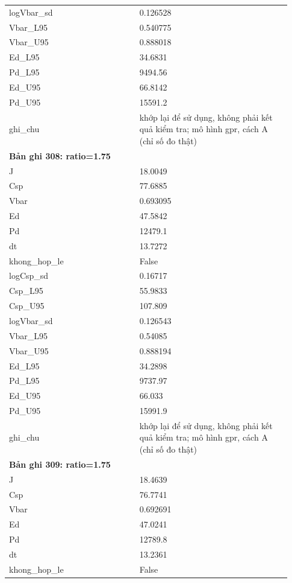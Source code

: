 \begin{longtable}{p{0.43\linewidth}p{0.50\linewidth}}
logVbar\_\allowbreak sd & 0.126528 \\
Vbar\_\allowbreak L95 & 0.540775 \\
Vbar\_\allowbreak U95 & 0.888018 \\
Ed\_\allowbreak L95 & 34.6831 \\
Pd\_\allowbreak L95 & 9494.56 \\
Ed\_\allowbreak U95 & 66.8142 \\
Pd\_\allowbreak U95 & 15591.2 \\
ghi\_\allowbreak chu & khớp lại để sử dụng, không phải kết quả kiểm tra; mô hình gpr, cách A (chỉ số đo thật) \\
\midrule
\multicolumn{2}{p{0.95\linewidth}}{\textbf{Bản ghi 308: ratio=1.75}} \\
J & 18.0049 \\
Csp & 77.6885 \\
Vbar & 0.693095 \\
Ed & 47.5842 \\
Pd & 12479.1 \\
dt & 13.7272 \\
khong\_\allowbreak hop\_\allowbreak le & False \\
logCsp\_\allowbreak sd & 0.16717 \\
Csp\_\allowbreak L95 & 55.9833 \\
Csp\_\allowbreak U95 & 107.809 \\
logVbar\_\allowbreak sd & 0.126543 \\
Vbar\_\allowbreak L95 & 0.54085 \\
Vbar\_\allowbreak U95 & 0.888194 \\
Ed\_\allowbreak L95 & 34.2898 \\
Pd\_\allowbreak L95 & 9737.97 \\
Ed\_\allowbreak U95 & 66.033 \\
Pd\_\allowbreak U95 & 15991.9 \\
ghi\_\allowbreak chu & khớp lại để sử dụng, không phải kết quả kiểm tra; mô hình gpr, cách A (chỉ số đo thật) \\
\midrule
\multicolumn{2}{p{0.95\linewidth}}{\textbf{Bản ghi 309: ratio=1.75}} \\
J & 18.4639 \\
Csp & 76.7741 \\
Vbar & 0.692691 \\
Ed & 47.0241 \\
Pd & 12789.8 \\
dt & 13.2361 \\
khong\_\allowbreak hop\_\allowbreak le & False \\

\end{longtable}
